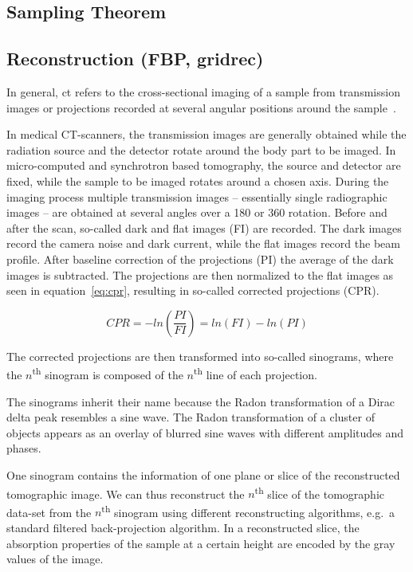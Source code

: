 \subsection{Sampling Theorem}
\subsection{Reconstruction (FBP, gridrec)}

In general, \ac{ct} refers to the cross-sectional imaging of a sample from transmission images or projections recorded at several angular positions around the sample~\cite{Kak2002}.

In medical \ac{CT}-scanners, the transmission images are generally obtained while the radiation source and the detector rotate around the body part to be imaged. In micro-computed and synchrotron based tomography, the source and detector are fixed, while the sample to be imaged rotates around a chosen axis. During the imaging process multiple transmission images -- essentially single radiographic images -- are obtained at several angles over a \unit{180}{\degree} or \unit{360}{\degree} rotation. Before and after the scan, so-called dark and flat images (FI) are recorded. The dark images record the camera noise and dark current, while the flat images record the beam profile. After baseline correction of the projections (PI) the average of the dark images is subtracted. The projections are then normalized to the flat images as seen in equation~\ref{eq:cpr}, resulting in so-called corrected projections (CPR).

\begin{equation}
	CPR=-ln\left(\frac{PI}{FI}\right)=ln(FI)-ln(PI)
	\label{eq:cpr}
\end{equation}

The corrected projections are then transformed into so-called sinograms, where the $n$\textsuperscript{th} sinogram is composed of the $n$\textsuperscript{th} line of each projection.

The sinograms inherit their name because the Radon transformation of a Dirac delta peak resembles a sine wave. The Radon transformation of a cluster of objects appears as an overlay of blurred sine waves with different amplitudes and phases.

One sinogram contains the information of one plane or slice of the reconstructed tomographic image. We can thus reconstruct the $n$\textsuperscript{th} slice of the tomographic data-set from the $n$\textsuperscript{th} sinogram using different reconstructing algorithms, e.g.\ a standard filtered back-projection algorithm. In a reconstructed slice, the absorption properties of the sample at a certain height are encoded by the gray values of the image.

